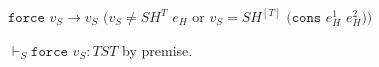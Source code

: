 \begin{case}

$\mathtt{force}$ $v_{S}\rightarrow v_{S}$ $(v_{S}\neq SH^{T}$ $e_{H}$ or $v_{S}=SH^{[T]}$ $(\mathtt{cons}$ $e_{H}^{1}$ $e_{H}^{2}))$

$\vdash_{S}\mathtt{force}$ $v_{S}:TST$ by premise.  

\end{case}